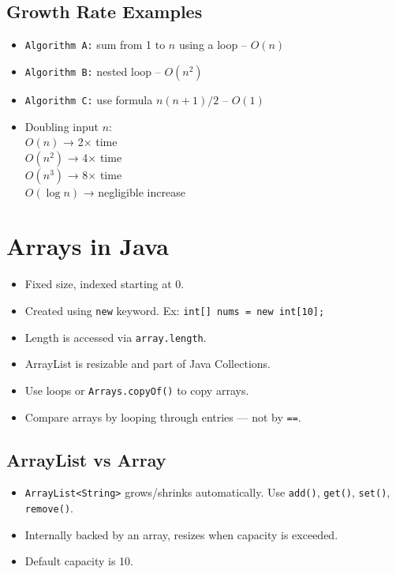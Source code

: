 \documentclass[11pt]{article}
\begin{document}
\subsection*{Growth Rate Examples}
\begin{itemize}[leftmargin=*]
\item \texttt{Algorithm A:} sum from 1 to $n$ using a loop – $O(n)$
\item \texttt{Algorithm B:} nested loop – $O(n^2)$
\item \texttt{Algorithm C:} use formula $n(n+1)/2$ – $O(1)$
\item Doubling input $n$: \\
$O(n)$ → 2× time \\
$O(n^2)$ → 4× time \\
$O(n^3)$ → 8× time \\
$O(\log n)$ → negligible increase
\end{itemize}

\hrulefill

\section*{Arrays in Java}
\begin{itemize}[leftmargin=*]
\item Fixed size, indexed starting at 0.
\item Created using \texttt{new} keyword. Ex: \texttt{int[] nums = new int[10];}
\item Length is accessed via \texttt{array.length}.
\item ArrayList is resizable and part of Java Collections.
\item Use loops or \texttt{Arrays.copyOf()} to copy arrays.
\item Compare arrays by looping through entries — not by \texttt{==}.
\end{itemize}


\subsection*{ArrayList vs Array}
\begin{itemize}[leftmargin=*]
\item \texttt{ArrayList<String>} grows/shrinks automatically. Use \texttt{add()}, \texttt{get()}, \texttt{set()}, \texttt{remove()}.
\item Internally backed by an array, resizes when capacity is exceeded.
\item Default capacity is 10.
\end{itemize}
\end{document}
